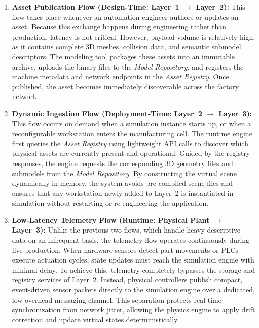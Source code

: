 \begin{enumerate}
    \item \textbf{Asset Publication Flow (Design-Time: Layer~1 $\rightarrow$ Layer~2):} This flow takes place whenever an automation engineer authors or updates an asset. Because this exchange happens during engineering rather than production, latency is not critical. However, payload volume is relatively high, as it contains complete 3D meshes, collision data, and semantic submodel descriptors. The modeling tool packages these assets into an immutable archive, uploads the binary files to the \textit{Model Repository}, and registers the machine metadata and network endpoints in the \textit{Asset Registry}. Once published, the asset becomes immediately discoverable across the factory network.

    \item \textbf{Dynamic Ingestion Flow (Deployment-Time: Layer~2 $\rightarrow$ Layer~3):} This flow occurs on demand when a simulation instance starts up, or when a reconfigurable workstation enters the manufacturing cell. The runtime engine first queries the \textit{Asset Registry} using lightweight \gls{API} calls to discover which physical assets are currently present and operational. Guided by the registry responses, the engine requests the corresponding 3D geometry files and submodels from the \textit{Model Repository}. By constructing the virtual scene dynamically in memory, the system avoids pre-compiled scene files and ensures that any workstation newly added to Layer~2 is instantiated in simulation without restarting or re-engineering the application.

    \item \textbf{Low-Latency Telemetry Flow (Runtime: Physical Plant $\rightarrow$ Layer~3):} Unlike the previous two flows, which handle heavy descriptive data on an infrequent basis, the telemetry flow operates continuously during live production. When hardware sensors detect part movements or PLCs execute actuation cycles, state updates must reach the simulation engine with minimal delay. To achieve this, telemetry completely bypasses the storage and registry services of Layer~2. Instead, physical controllers publish compact, event-driven sensor packets directly to the simulation engine over a dedicated, low-overhead messaging channel. This separation protects real-time synchronization from network jitter, allowing the physics engine to apply drift correction and update virtual states deterministically.
\end{enumerate}

